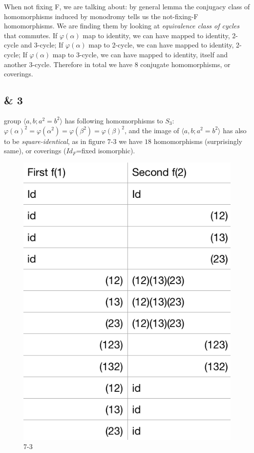 \documentclass[11pt]{article}
\theoremstyle{remark}
\begin{document}
    When not fixing F, we are talking about: by general lemma the conjugacy class of homomorphisms induced by monodromy tells us the not-fixing-F homomorphisms. We are finding them by looking at \textit{equivalence class of cycles} that commutes. If $\varphi(\alpha)$ map to identity, we can have mapped to identity, 2-cycle and 3-cycle; If $\varphi(\alpha)$ map to 2-cycle, we can have mapped to identity, 2-cycle; If $\varphi(\alpha)$ map to 3-cycle, we can have mapped to identity, itself and another 3-cycle. Therefore in total we have 8 conjugate homomorphisms, or coverings. 
    
\subsection*{ & 3}    
    group $\langle a,b; a^2=b^2 \rangle$ has following homomorphisms to $S_3$:   ${\varphi(\alpha)}^2=\varphi(\alpha^2)=\varphi(\beta^2)=\varphi(\beta)^2$, and the image of $\langle a,b; a^2=b^2 \rangle$ has also to be \textit{square-identical}, as in figure 7-3 we have $18$ homomorphisms (surprisingly same), or coverings ($Id_F$=fixed isomorphic).
    
    \begin{figure}[h!]
    \centering
    \includegraphics[scale=0.5]{7-3_update.png}
    \caption{7-3}
    \end{figure}
    
\end{document}
